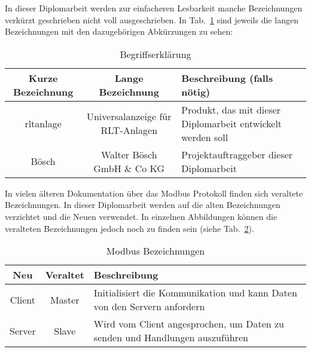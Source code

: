 


In dieser Diplomarbeit werden zur einfacheren Lesbarkeit manche Bezeichnungen verkürzt geschrieben \bzw nicht voll ausgeschrieben. In Tab.~\ref{tab:begriffserklaerung} sind jeweils die langen Bezeichnungen mit den dazugehörigen Abkürzungen zu sehen:
\begin{table}[h]
	\caption{Begriffserklärung \label{tab:begriffserklaerung}}
	\begin{tabularx}{\textwidth}{@{}c|c|X@{}}
		\toprule
		\textbf{Kurze Bezeichnung} & \textbf{Lange Bezeichnung} & \textbf{Beschreibung (falls nötig)} \\
		\midrule
		\acs{rltanlage} & Universalanzeige für RLT-Anlagen &  Produkt, das mit dieser Diplomarbeit entwickelt werden soll \\
		Bösch & Walter Bösch GmbH \& Co KG & Projektauftraggeber dieser Diplomarbeit \\
		\bottomrule
	\end{tabularx}
\end{table}


In vielen älteren Dokumentation über das Modbus Protokoll finden sich veraltete Bezeichnungen. In dieser Diplomarbeit werden auf die alten Bezeichnungen verzichtet und die Neuen verwendet. In einzelnen Abbildungen können die veralteten Bezeichnungen jedoch noch zu finden sein (siehe Tab.~\ref{tab:modbus_bezeichnung}). 
\begin{table}[h]
	\caption{Modbus Bezeichnungen \label{tab:modbus_bezeichnung}}
	\begin{tabularx}{\textwidth}{@{}c|c|X@{}}
		\toprule
		\textbf{Neu} & \textbf{Veraltet} & \textbf{Beschreibung} \\
		\midrule
		Client & Master & Initialisiert die Kommunikation und kann Daten von den Servern anfordern \\
		Server & Slave & Wird vom Client angesprochen, um Daten zu senden und Handlungen auszuführen \\
		\bottomrule
	\end{tabularx}
\end{table}



